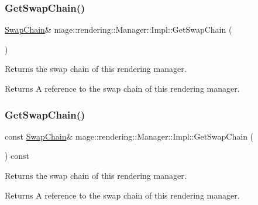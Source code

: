 \subsubsection{\texorpdfstring{Get\+Swap\+Chain()}{GetSwapChain()}\hspace{0.1cm}{\footnotesize\ttfamily [1/2]}}
{\footnotesize\ttfamily \mbox{\hyperlink{classmage_1_1rendering_1_1_swap_chain}{Swap\+Chain}}\& mage\+::rendering\+::\+Manager\+::\+Impl\+::\+Get\+Swap\+Chain (\begin{DoxyParamCaption}{ }\end{DoxyParamCaption})\hspace{0.3cm}{\ttfamily [noexcept]}}

Returns the swap chain of this rendering manager.

\begin{DoxyReturn}{Returns}
A reference to the swap chain of this rendering manager. 
\end{DoxyReturn}
\mbox{\label{classmage_1_1rendering_1_1_manager_1_1_impl_a7595cf95fc4af88ae359d77fce0681b3}} 
\subsubsection{\texorpdfstring{Get\+Swap\+Chain()}{GetSwapChain()}\hspace{0.1cm}{\footnotesize\ttfamily [2/2]}}
{\footnotesize\ttfamily const \mbox{\hyperlink{classmage_1_1rendering_1_1_swap_chain}{Swap\+Chain}}\& mage\+::rendering\+::\+Manager\+::\+Impl\+::\+Get\+Swap\+Chain (\begin{DoxyParamCaption}{ }\end{DoxyParamCaption}) const\hspace{0.3cm}{\ttfamily [noexcept]}}

Returns the swap chain of this rendering manager.

\begin{DoxyReturn}{Returns}
A reference to the swap chain of this rendering manager. 
\end{DoxyReturn}
\mbox{\label{classmage_1_1rendering_1_1_manager_1_1_impl_a01dbb540b262170ae3518c9a72945046}} 
